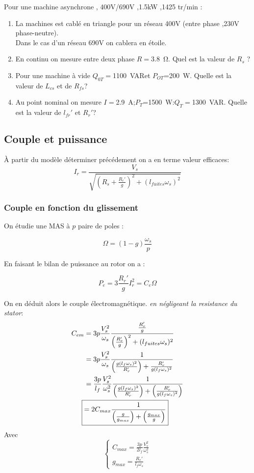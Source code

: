 \documentclass[main.tex]{subfiles}
\begin{document}
\begin{exemple}
  Pour une machine asynchrone , 400V/690V ,1.5kW ,1425 tr/min :
  \begin{enumerate}
  \item La machines est cablé en triangle pour un réseau 400V (entre phase ,230V phase-neutre). \\
    Dans le cas d'un réseau 690V on cablera en étoile.
  \item En continu on mesure entre deux phase $R=$\SI{3.8}{\ohm}. Quel est la valeur de $R_s$ ?
  \item Pour une machine à vide $Q_{0T}=$\SI{1100}{VAR}et $P_{OT}$=\SI{200}{W}. Quelle est la valeur de $L_{cs}$ et  de $R_{fs}$?
  \item Au point nominal on mesure $I=$\SI{2,9}{A};$P_T$=\SI{1500}{W}:$Q_T=$\SI{1300}{VAR}. Quelle est la valeur de $l_{fr}'$ et $R_r'$?
  \end{enumerate}
\end{exemple}
\subsection{Couple et puissance}

À partir du modèle déterminer précédement on a en terme valeur efficaces:
\[
  I_r = \frac{V_s}{\sqrt{\left(R_s+\frac{R_r'}{g}\right)^2+(l_{fuites}\omega_s)^2}}
\]


\subsubsection{Couple en fonction du glissement}

On étudie une MAS à $p$ paire de poles :

\[
\Omega =(1-g)\frac{\omega_s}{p}
\]

En faisant le bilan de puissance au rotor  on a :

\[
P_e = 3 \frac{R_r'}{g}I_r^2 = C_e \Omega
\]

On en déduit alors le couple électromagnétique. \emph{en négligeant la resistance du stator}:
\begin{align*}
 C_{em} &=   3 p \frac{V_s^2}{\omega_s} \frac{\frac{R_r'}{g}}{\left(\frac{R_r'}{g}\right)^2+(l_{fuites}\omega_s)^2}\\
    &= 3 p \frac{V_s^2}{\omega_s} \frac{1}{\left(\frac{g(l_f\omega_s)^2}{R_r'}\right) + \frac{R_r'}{g(l_f\omega_s)^2}}\\
    &= \frac{3p}{l_f}\frac{V_s^2}{\omega_s^2}\frac{1}{\left(\frac{g(l_f\omega_s)^2}{R_r'}\right)+\left(\frac{R_r'}{g(l_f\omega_s)^2}\right)}\\
        \Aboxed{&= 2C_{max}\frac{1}{\left(\frac{g}{g_{max}}\right)+\left(\frac{g_{max}}{g}\right)}}
\end{align*}
Avec
\[
  \begin{cases}
    C_{max} = \frac{3p}{2l_f}\frac{V_s^2}{\omega_s^2}\\
    g_{max} = \frac{R_r'}{l_f\omega_s}
  \end{cases}
\]
\end{document}
